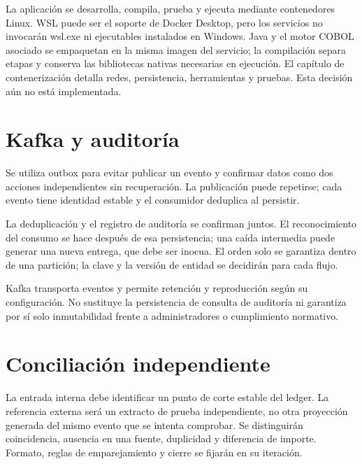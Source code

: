 La aplicación se desarrolla, compila, prueba y ejecuta mediante contenedores Linux. WSL puede ser el soporte de Docker Desktop, pero los servicios no invocarán wsl.exe ni ejecutables instalados en Windows. Java y el motor COBOL asociado se empaquetan en la misma imagen del servicio; la compilación separa etapas y conserva las bibliotecas nativas necesarias en ejecución. El capítulo de contenerización detalla redes, persistencia, herramientas y pruebas. Esta decisión aún no está implementada.

\section{Kafka y auditoría}
Se utiliza outbox para evitar publicar un evento y confirmar datos como dos acciones independientes sin recuperación. La publicación puede repetirse; cada evento tiene identidad estable y el consumidor deduplica al persistir.

La deduplicación y el registro de auditoría se confirman juntos. El reconocimiento del consumo se hace después de esa persistencia; una caída intermedia puede generar una nueva entrega, que debe ser inocua. El orden solo se garantiza dentro de una partición; la clave y la versión de entidad se decidirán para cada flujo.

Kafka transporta eventos y permite retención y reproducción según su configuración. No sustituye la persistencia de consulta de auditoría ni garantiza por sí solo inmutabilidad frente a administradores o cumplimiento normativo.

\section{Conciliación independiente}
La entrada interna debe identificar un punto de corte estable del ledger. La referencia externa será un extracto de prueba independiente, no otra proyección generada del mismo evento que se intenta comprobar. Se distinguirán coincidencia, ausencia en una fuente, duplicidad y diferencia de importe. Formato, reglas de emparejamiento y cierre se fijarán en su iteración.
